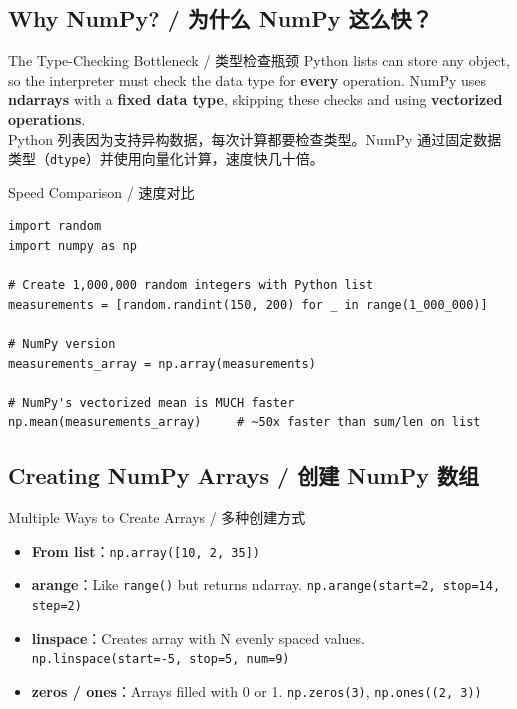 \documentclass[11pt,a4paper]{article}
\begin{document}
\subsection{Why NumPy? / 为什么 NumPy 这么快？}

\begin{concept}{The Type-Checking Bottleneck / 类型检查瓶颈}
    Python lists can store any object, so the interpreter must check the data type for \textbf{every} operation. NumPy uses \textbf{ndarrays} with a \textbf{fixed data type}, skipping these checks and using \textbf{vectorized operations}. \\
    Python 列表因为支持异构数据，每次计算都要检查类型。NumPy 通过固定数据类型（\texttt{dtype}）并使用向量化计算，速度快几十倍。
\end{concept}

\begin{examplebox}{Speed Comparison / 速度对比}
\begin{lstlisting}
import random
import numpy as np

# Create 1,000,000 random integers with Python list
measurements = [random.randint(150, 200) for _ in range(1_000_000)]

# NumPy version
measurements_array = np.array(measurements)

# NumPy's vectorized mean is MUCH faster
np.mean(measurements_array)     # ~50x faster than sum/len on list
\end{lstlisting}
\end{examplebox}

\subsection{Creating NumPy Arrays / 创建 NumPy 数组}

\begin{concept}{Multiple Ways to Create Arrays / 多种创建方式}
    \begin{itemize}[itemsep=0.5em]
        \item \textbf{From list}：\texttt{np.array([10, 2, 35])}
        \item \textbf{arange}：Like \texttt{range()} but returns ndarray. \texttt{np.arange(start=2, stop=14, step=2)}
        \item \textbf{linspace}：Creates array with N evenly spaced values. \texttt{np.linspace(start=-5, stop=5, num=9)}
        \item \textbf{zeros / ones}：Arrays filled with 0 or 1. \texttt{np.zeros(3)}, \texttt{np.ones((2, 3))}
    \end{itemize}
\end{concept}
\end{document}
